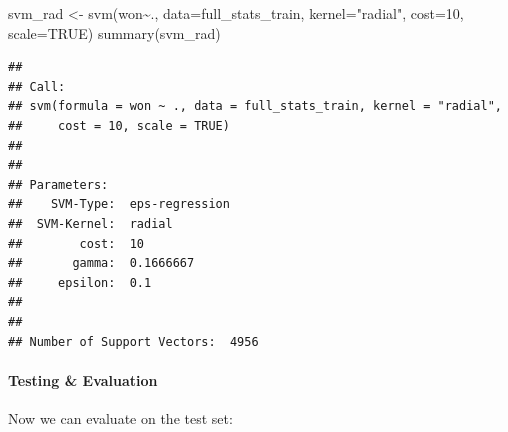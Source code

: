 \documentclass[
]{article}
\newenvironment{Shaded}{\begin{snugshade}}{\end{snugshade}}
\newcommand{\AttributeTok}[1]{\textcolor[rgb]{0.77,0.63,0.00}{#1}}
\newcommand{\ConstantTok}[1]{\textcolor[rgb]{0.00,0.00,0.00}{#1}}
\newcommand{\DecValTok}[1]{\textcolor[rgb]{0.00,0.00,0.81}{#1}}
\newcommand{\FloatTok}[1]{\textcolor[rgb]{0.00,0.00,0.81}{#1}}
\newcommand{\FunctionTok}[1]{\textcolor[rgb]{0.00,0.00,0.00}{#1}}
\newcommand{\NormalTok}[1]{#1}
\newcommand{\OtherTok}[1]{\textcolor[rgb]{0.56,0.35,0.01}{#1}}
\newcommand{\SpecialCharTok}[1]{\textcolor[rgb]{0.00,0.00,0.00}{#1}}
\newcommand{\StringTok}[1]{\textcolor[rgb]{0.31,0.60,0.02}{#1}}
\begin{document}
\begin{Shaded}
\begin{Highlighting}[]
\NormalTok{svm\_rad }\OtherTok{\textless{}{-}} \FunctionTok{svm}\NormalTok{(won}\SpecialCharTok{\textasciitilde{}}\NormalTok{., }\AttributeTok{data=}\NormalTok{full\_stats\_train, }\AttributeTok{kernel=}\StringTok{"radial"}\NormalTok{, }\AttributeTok{cost=}\DecValTok{10}\NormalTok{, }\AttributeTok{scale=}\ConstantTok{TRUE}\NormalTok{)}
\FunctionTok{summary}\NormalTok{(svm\_rad)}
\end{Highlighting}
\end{Shaded}

\begin{verbatim}
## 
## Call:
## svm(formula = won ~ ., data = full_stats_train, kernel = "radial", 
##     cost = 10, scale = TRUE)
## 
## 
## Parameters:
##    SVM-Type:  eps-regression 
##  SVM-Kernel:  radial 
##        cost:  10 
##       gamma:  0.1666667 
##     epsilon:  0.1 
## 
## 
## Number of Support Vectors:  4956
\end{verbatim}

\hypertarget{testing-evaluation-2}{%
\paragraph{Testing \& Evaluation}\label{testing-evaluation-2}}

Now we can evaluate on the test set:

\begin{Shaded}
\end{Shaded}
\end{document}

